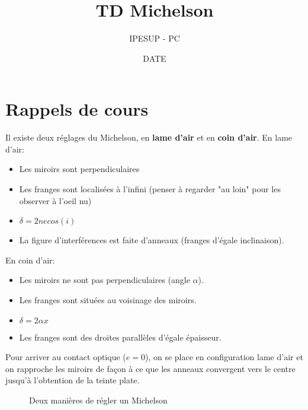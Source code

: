 \documentclass{article}
\title{TD Michelson }
\author{IPESUP - PC }
\date{DATE}
\begin{document}
\maketitle

\section{Rappels de cours}

Il existe deux réglages du Michelson, en \textbf{lame d'air} et en \textbf{coin d'air}. 
En lame d'air: \\
\begin{itemize}
  \item Les miroirs sont perpendiculaires
  \item Les franges sont localisées à l'infini (penser à regarder "au loin" pour les observer à l'oeil nu)
  \item $\delta = 2ne cos(i)$ 
  \item La figure d'interférences est faite d'anneaux (franges d'égale inclinaison). \\

\end{itemize}

En coin d'air: \\
\begin{itemize}
  \item Les miroirs ne sont pas perpendiculaires (angle $\alpha$). 
  \item Les franges sont situées au voisinage des miroirs. 
  \item $\delta = 2 \alpha x $
  \item Les franges sont des droites parallèles d'égale épaisseur. \\
\end{itemize}

Pour arriver au contact optique ($e=0$), on se place en configuration lame d'air et on rapproche les miroirs de façon à ce que les anneaux convergent vers le centre jusqu'à l'obtention de la teinte plate. 


\begin{figure}[htbp]
  \caption{Deux manières de régler un Michelson}
\end{figure}
\end{document}
